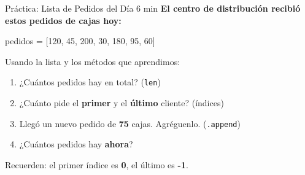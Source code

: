 \documentclass[aspectratio=169, 11pt]{beamer}
\begin{document}
\begin{frame}[fragile,shrink=30]{Práctica: Lista de Pedidos del Día \hfill {\normalsize\color{arcaRed}\faClock\hspace{4pt}6 min}}
  \vspace{-6pt}
  {\small\color{arcaDark}\bfseries
    El centro de distribución recibió estos pedidos de cajas hoy:}

  \vspace{6pt}
  \begin{center}
  {\footnotesize\ttfamily
    pedidos = [120, 45, 200, 30, 180, 95, 60]}
  \end{center}

  \vspace{6pt}
  {\footnotesize\color{textMuted}
    Usando la lista y los métodos que aprendimos:}

  \vspace{2pt}
  {\footnotesize
  \begin{enumerate}\setlength{\itemsep}{3pt}
    \item[{\color{arcaRed}\bfseries 1.}]
      ¿Cuántos pedidos hay en total? (\texttt{len})
    \item[{\color{arcaRed}\bfseries 2.}]
      ¿Cuánto pide el \textbf{primer} y el \textbf{último} cliente? (índices)
    \item[{\color{arcaRed}\bfseries 3.}]
      Llegó un nuevo pedido de \textbf{75} cajas. Agréguenlo. (\texttt{.append})
    \item[{\color{arcaRed}\bfseries 4.}]
      ¿Cuántos pedidos hay \textbf{ahora}?
  \end{enumerate}
  }

  \vspace{4pt}
  {\scriptsize\color{textMuted}
    \faLightbulb[regular]\hspace{4pt}
    Recuerden: el primer índice es \textbf{0},
    el último es \textbf{-1}.}
\end{frame}
\end{document}
